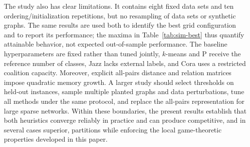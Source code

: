 The study also has clear limitations.  It contains eight fixed data sets and
ten ordering/initialization repetitions, but no resampling of data sets or
synthetic graphs.  The same results are used both to identify the best grid
configuration and to report its performance; the maxima in
Table~\ref{tab:sim-best} thus quantify attainable behavior, not expected
out-of-sample performance.  The baseline hyperparameters are fixed rather than
tuned jointly, \(k\)-means and P receive the reference number of classes, Jazz
lacks external labels, and Cora uses a restricted coalition capacity.
Moreover, explicit all-pairs distance and relation matrices impose quadratic
memory growth.  A larger study should select thresholds on held-out instances,
sample multiple planted graphs and data perturbations, tune all methods under
the same protocol, and replace the all-pairs representation for large sparse
networks.  Within these boundaries, the present results establish that both
heuristics converge reliably in practice and can produce competitive, and in
several cases superior, partitions while enforcing the local game-theoretic
properties developed in this paper.
